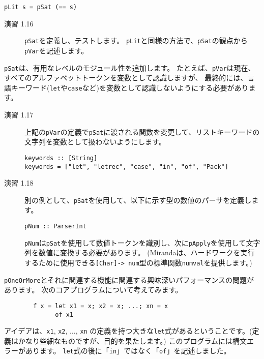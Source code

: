 \documentclass{jarticle}
\begin{document}
\begin{verbatim}
pLit s = pSat (== s)
\end{verbatim}

\begin{description}
	\item[演習 1.16] \texttt{pSat}を定義し、テストします。
		\texttt{pLit}と同様の方法で、\texttt{pSat}の観点から\texttt{pVar}を記述します。
\end{description}

\texttt{pSat}は、有用なレベルのモジュール性を追加します。
たとえば、\texttt{pVar}は現在、すべてのアルファベットトークンを変数として認識しますが、
最終的には、言語キーワード(\texttt{let}や\texttt{case}など)を変数として認識しないようにする必要があります。

\begin{description}
	\item[演習 1.17] 上記の\texttt{pVar}の定義で\texttt{pSat}に渡される関数を変更して、リストキーワードの文字列を変数として扱わないようにします。

		\begin{verbatim}
keywords :: [String]
keywords = ["let", "letrec", "case", "in", "of", "Pack"]
\end{verbatim}

	\item[演習 1.18] 別の例として、\texttt{pSat}を使用して、以下に示す型の数値のパーサを定義します。

		\begin{verbatim}
pNum :: ParserInt
\end{verbatim}

		\texttt{pNum}は\texttt{pSat}を使用して数値トークンを識別し、次に\texttt{pApply}を使用して文字列を数値に変換する必要があります。
		(Mirandaは、ハードワークを実行するために使用できる\texttt{[Char]-> num}型の標準関数\texttt{numval}を提供します。)
\end{description}

\texttt{pOneOrMore}とそれに関連する機能に関連する興味深いパフォーマンスの問題があります。
次のコアプログラムについて考えてみます。

\begin{verbatim}
        f x = let x1 = x; x2 = x; ...; xn = x
              of x1
\end{verbatim}

アイデアは、\texttt{x1}, \texttt{x2}, $\ldots$, \texttt{xn} の定義を持つ大きな\texttt{let}式があるということです。(定義はかなり些細なものですが、目的を果たします。)
このプログラムには構文エラーがあります。
\texttt{let}式の後に「\texttt{in}」ではなく「\texttt{of}」を記述しました。
\end{document}
